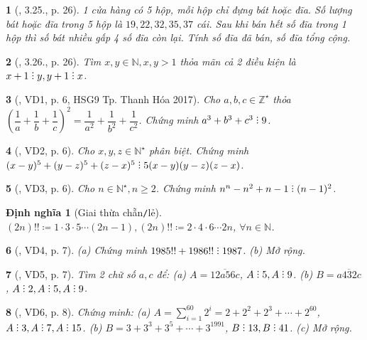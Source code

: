 \documentclass{article}
\newtheorem{baitoan}{}
\newtheorem{dinhnghia}{Định nghĩa}
\DeclareRobustCommand{\divby}{%
	\mathrel{\vbox{\baselineskip.65ex\lineskiplimit0pt\hbox{.}\hbox{.}\hbox{.}}}%
}
\begin{document}
\begin{baitoan}[\cite{TLCT_THCS_Toan_6_so_hoc}, 3.25., p. 26]
	1 cửa hàng có 5 hộp, mỗi hộp chỉ đựng bát hoặc đĩa. Số lượng bát hoặc đĩa trong 5 hộp là $19,22,32,35,37$ cái. Sau khi bán hết số đĩa trong 1 hộp thì số bát nhiều gấp 4 số đĩa còn lại. Tính số đĩa đã bán, số đĩa tổng cộng.
\end{baitoan}

\begin{baitoan}[\cite{TLCT_THCS_Toan_6_so_hoc}, 3.26., p. 26]
	Tìm $x,y\in\mathbb{N},x,y > 1$ thỏa mãn cả 2 điều kiện là $x + 1\divby y,y + 1\divby x$.
\end{baitoan}

\begin{baitoan}[\cite{Huy_so_hoc}, VD1, p. 6, HSG9 Tp. Thanh Hóa 2017]
	Cho $a,b,c\in\mathbb{Z}^\star$ thỏa $\left(\dfrac{1}{a} + \dfrac{1}{b} + \dfrac{1}{c}\right)^2 = \dfrac{1}{a^2} + \dfrac{1}{b^2} + \dfrac{1}{c^2}$. Chứng minh $a^3 + b^3 + c^3\divby9$.
\end{baitoan}

\begin{baitoan}[\cite{Huy_so_hoc}, VD2, p. 6]
	Cho $x,y,z\in\mathbb{N}^\star$ phân biệt. Chứng minh $(x - y)^5 + (y - z)^5 + (z - x)^5\divby5(x - y)(y - z)(z - x)$.
\end{baitoan}

\begin{baitoan}[\cite{Huy_so_hoc}, VD3, p. 6]
	Cho $n\in\mathbb{N}^\star,n\ge2$. Chứng minh $n^n - n^2 + n - 1\divby(n - 1)^2$.
\end{baitoan}

\begin{dinhnghia}[Giai thừa chẵn{\tt/}lẻ]
	$(2n)!!\coloneqq 1\cdot3\cdot5\cdots(2n - 1),(2n)!!\coloneqq2\cdot4\cdot6\cdots2n$, $\forall n\in\mathbb{N}$.
\end{dinhnghia}

\begin{baitoan}[\cite{Huy_so_hoc}, VD4, p. 7]
	(a) Chứng minh $1985!! + 1986!!\divby1987$. (b) Mở rộng.
\end{baitoan}

\begin{baitoan}[\cite{Huy_so_hoc}, VD5, p. 7]
	Tìm 2 chữ số $a,c$ để: (a) $A = \overline{12a56c}$, $A\divby5,A\divby9$. (b) $B = \overline{a432c}$, $A\divby2,A\divby5,A\divby9$.
\end{baitoan}

\begin{baitoan}[\cite{Huy_so_hoc}, VD6, p. 8]
	Chứng minh: (a) $A = \sum_{i=1}^{60} 2^i = 2 + 2^2 + 2^3 + \cdots + 2^{60}$, $A\divby3,A\divby7,A\divby15$. (b) $B = 3 + 3^3 + 3^5 + \cdots + 3^{1991}$, $B\divby13,B\divby41$. (c) Mở rộng.
\end{baitoan}
\end{document}

